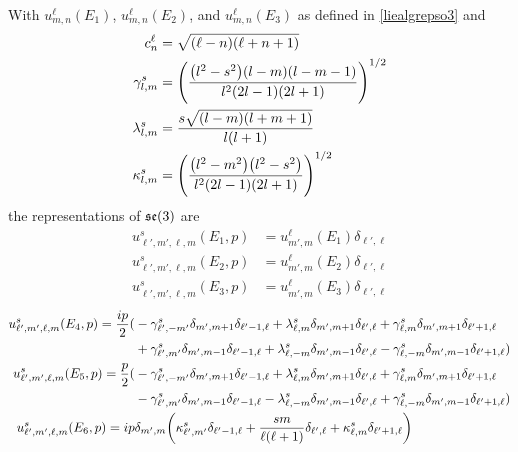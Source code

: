 \documentclass[../../main.tex]{subfiles}
\begin{document}
\begin{refsection}
	\begin{theorem} \label{liealgrepse3}
		With $u^\ell_{m,n}(E_1)$, $u^\ell_{m,n}(E_2)$, and $u^\ell_{m,n}(E_3)$ as defined in \cref{liealgrepso3} and
		\begin{align*}
			c^\ell_n           & = \sqrt{(\ell - n)(\ell + n + 1)}                                             \\
			\gamma_{l, m}^{s}  & =\qty(\frac{\qty(l^{2}-s^{2})(l-m)(l-m-1)}{l^{2}(2 l-1)(2 l+1)})^{1 / 2}      \\
			\lambda_{l, m}^{s} & =\frac{s \sqrt{(l-m)(l+m+1)}}{l(l+1)}                                         \\
			\kappa_{l, m}^{s}  & =\qty(\frac{\qty(l^{2}-m^{2})\qty(l^{2}-s^{2})}{l^{2}(2 l-1)(2 l+1)})^{1 / 2}
		\end{align*}
		the representations of $\mathfrak{se} (3)$ are
		\begin{align*}
			u^s_{\ell', m' , \ell, m}(E_1 , p) & = u^\ell_{m',m}(E_1) \delta_{\ell',\ell} \\
			u^s_{\ell', m' , \ell, m}(E_2 , p) & = u^\ell_{m',m}(E_2) \delta_{\ell',\ell} \\
			u^s_{\ell', m' , \ell, m}(E_3 , p) & = u^\ell_{m',m}(E_3) \delta_{\ell',\ell}
		\end{align*}
		\begin{align*}
			u^s_{\ell', m' , \ell, m}(E_4 , p) =
			\frac{i p}{2} ( & - \gamma_{\ell',-m'}^{s} \delta_{m', m+1} \delta_{\ell'-1, \ell} + \lambda_{\ell, m}^{s} \delta_{m', m+1} \delta_{\ell', \ell} + \gamma_{\ell, m}^{s} \delta_{m', m+1} \delta_{\ell'+1, \ell}   \\
			                  & + \gamma_{\ell', m'}^{s} \delta_{m', m-1} \delta_{\ell'-1, \ell} + \lambda_{\ell,-m}^{s} \delta_{m', m-1} \delta_{\ell', \ell} - \gamma_{\ell,-m}^{s} \delta_{m', m-1} \delta_{\ell'+1, \ell} ) \\
			u^s_{\ell', m' , \ell, m}(E_5 , p) =
			\frac{p}{2} (     & - \gamma_{\ell',-m'}^{s} \delta_{m', m+1} \delta_{\ell'-1, \ell} + \lambda_{\ell, m}^{s} \delta_{m', m+1} \delta_{\ell', \ell} + \gamma_{\ell, m}^{s} \delta_{m', m+1} \delta_{\ell'+1, \ell}   \\
			                  & - \gamma_{\ell', m'}^{s} \delta_{m', m-1} \delta_{\ell'-1, \ell} - \lambda_{\ell,-m}^{s} \delta_{m', m-1} \delta_{\ell', \ell} + \gamma_{\ell,-m}^{s} \delta_{m', m-1} \delta_{\ell'+1, \ell} ) \\
			u^s_{\ell', m' , \ell, m}(E_6 , p) =
			i p             & \delta_{m', m} \qty( \kappa_{\ell', m'}^{s} \delta_{\ell'-1, \ell} + \frac{s m}{\ell(\ell+1)} \delta_{\ell', \ell} + \kappa_{\ell, m}^{s} \delta_{\ell'+1, \ell} )
		\end{align*}
	\end{theorem}


\end{refsection}
\end{document}
